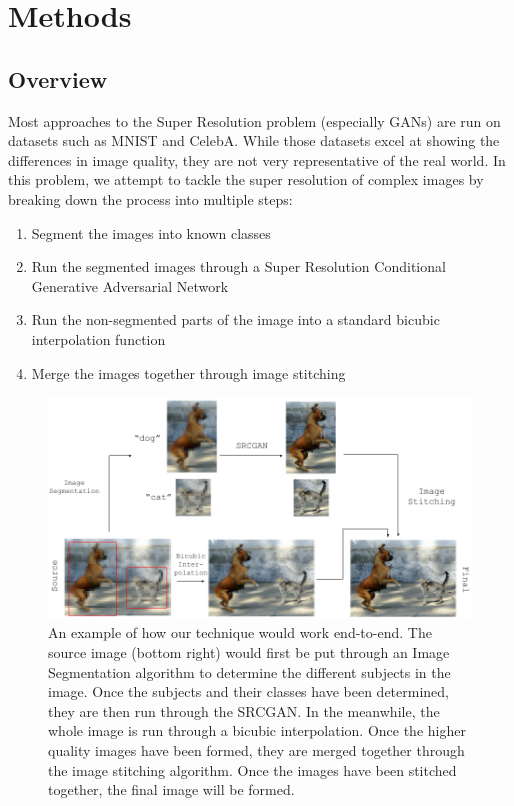 \section{Methods}

\subsection{Overview}
Most approaches to the Super Resolution problem (especially GANs) are run on
datasets such as MNIST and CelebA. While those datasets excel at showing the
differences in image quality, they are not very representative of the real
world. In this problem, we attempt to tackle the super resolution of complex
images by breaking down the process into multiple steps:

\begin{enumerate}
	\item Segment the images into known classes
	\item Run the segmented images through a Super Resolution Conditional Generative Adversarial Network
	\item Run the non-segmented parts of the image into a standard bicubic interpolation function
	\item Merge the images together through image stitching

\end{enumerate}

\begin{figure}
	\centering
	\includegraphics{images/intuition.png}
	\caption{An example of how our technique would work end-to-end. The source
	image (bottom right) would first be put through an Image Segmentation
	algorithm to determine the different subjects in the image. Once the subjects
	and their classes have been determined, they are then run through the SRCGAN.
	In the meanwhile, the whole image is run through a bicubic interpolation. Once
	the higher quality images have been formed, they are merged together through
	the image stitching algorithm. Once the images have been stitched together,
	the final image will be formed.}
	\label{fig:intuition}
\end{figure}

